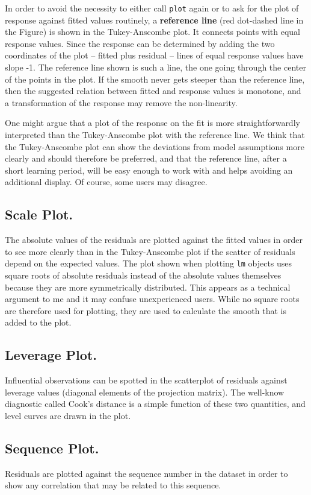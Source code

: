\documentclass{article}
\providecommand{\T}{\texttt}
\providecommand{\ul}{\textbf}
\begin{document}
In order to avoid the necessity to either call \T{plot} again or to 
ask for the plot of response against fitted values routinely,
a \ul{reference line} (red dot-dashed line in the Figure)
is shown in the Tukey-Anscombe plot.
It connects points with equal response values. Since the response can be
determined by adding the two coordinates of the plot -- 
fitted plus residual -- lines of equal response values have slope -1.
The reference line shown is such a line, the one going through the center
of the points in the plot.
If the smooth never gets steeper than the reference line, then the
suggested relation between fitted and response values is monotone, and a
transformation of the response may remove the non-linearity.

One might argue that a plot of the response on the fit is more
straightforwardly interpreted than the Tukey-Anscombe plot with the
reference line. We think that the Tukey-Anscombe plot can show the
deviations from model assumptions more clearly and should therefore be
preferred, and that the reference line, after a short learning period, will
be easy enough to work with and helps avoiding an additional display. 
Of course, some users may disagree.

\subsection{Scale Plot.}
The absolute values of the residuals are plotted against the fitted values
in order to see more clearly than in the Tukey-Anscombe plot if the scatter
of residuals depend on the expected values.
The plot shown when plotting \T{lm} objects uses square roots of absolute
residuals instead of the absolute values themselves because they are more
symmetrically distributed. This appears as a technical argument to me and
it may confuse unexperienced users. While no square roots are therefore
used for plotting, they are used to calculate the smooth that is added to
the plot.

\subsection{Leverage Plot.}
Influential observations can be spotted in the scatterplot of residuals
against leverage values (diagonal elements of the projection matrix).
The well-know diagnostic called Cook's distance is a simple function of
these two quantities, and level curves are drawn in the plot.

\subsection{Sequence Plot.}
Residuals are plotted against the sequence number in the dataset in order
to show any correlation that may be related to this sequence.
\end{document}

